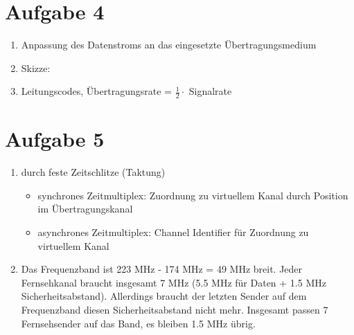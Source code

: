 \documentclass{article}
\begin{document}
	\section*{Aufgabe 4}
	\begin{enumerate}[label=(\alph*)]
		\item Anpassung des Datenstroms an das eingesetzte Übertragungsmedium
		\item Skizze:
		\begin{center}
		\end{center}
		\item Leitungscodes, Übertragungsrate = $\frac{1}{2}\cdot$ Signalrate
	\end{enumerate}

	\section*{Aufgabe 5}
	\begin{enumerate}[label=(\alph*)]
		\item durch feste Zeitschlitze (Taktung)
		\begin{itemize}
			\item synchrones Zeitmultiplex: Zuordnung zu virtuellem Kanal durch Position im Übertragungskanal
			\item asynchrones Zeitmultiplex: Channel Identifier für Zuordnung zu virtuellem Kanal
		\end{itemize}
		\item Das Frequenzband ist 223 MHz - 174 MHz = 49 MHz breit. Jeder Fernsehkanal braucht insgesamt 7 MHz (5.5 MHz für Daten + 1.5 MHz Sicherheitsabstand). Allerdings braucht der letzten Sender auf dem Frequenzband diesen Sicherheitsabstand nicht mehr. Insgesamt passen 7 Fernsehsender auf das Band, es bleiben 1.5 MHz übrig.
	\end{enumerate}
	
\end{document}
